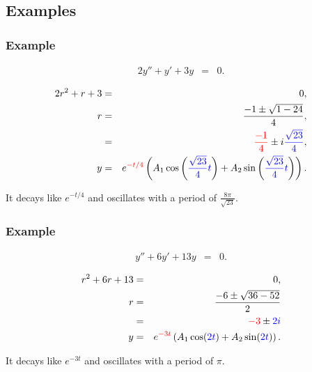 \subsection{Examples}

\begin{frame}
  \frametitle{Example}

  \begin{eqnarray*}
    2y'' + y' + 3y & = & 0.
  \end{eqnarray*}

  {
    \begin{eqnarray*}
      2r^2+r+3 & = & 0, \\
      r & = & \frac{-1\pm\sqrt{1-24}}{4}, \\
      & = & {\color{red}\frac{-1}{4}} \pm i{\color{blue}\frac{\sqrt{23}}{4}}, \\
      y & = & e^{{\color{red}-t/4}}
      \left( A_1 \cos\left( {\color{blue}\frac{\sqrt{23}}{4} t} \right) + A_2 \sin\left( {\color{blue}\frac{\sqrt{23}}{4} t} \right) \right).
    \end{eqnarray*}

    It decays like $e^{-t/4}$ and oscillates with a period of $\frac{8\pi}{\sqrt{23}}$.
  }

\end{frame}


\begin{frame}
  \frametitle{Example}

  \begin{eqnarray*}
    y'' + 6 y' + 13y & = & 0.
  \end{eqnarray*}

  {
    \begin{eqnarray*}
      r^2 + 6r + 13 & = & 0, \\
      r & = & \frac{-6\pm\sqrt{36-52}}{2} \\
      & = & {\color{red}-3} \pm {\color{blue}2i} \\
      y & = & e^{{\color{red}-3t}} \left( A_1 \cos({\color{blue}2t}) + A_2 \sin({\color{blue}2t}) \right).
    \end{eqnarray*}

    It decays like $e^{-3t}$ and oscillates with a period of $\pi$.
  }

\end{frame}


